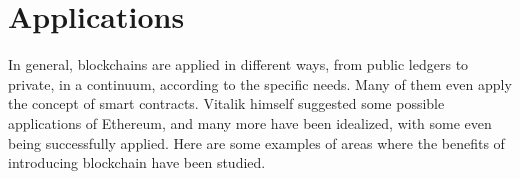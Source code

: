 




\section{Applications}

    In general, blockchains are applied in different ways, from public ledgers to private, in a continuum, according to the specific needs. Many of them even apply the concept of smart contracts. Vitalik himself suggested some possible applications of Ethereum, and many more have been idealized, with some even being successfully applied. Here are some examples of areas where the benefits of introducing blockchain have been studied.
    

